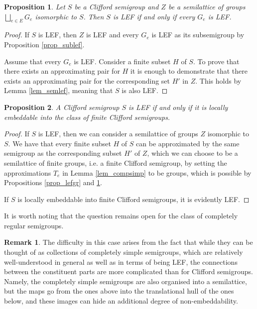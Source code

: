\documentclass{article}
\newtheorem{proposition}{Proposition}
\theoremstyle{definition}
\newtheorem{remark}{Remark}
\begin{document}
\begin{proposition}\label{prop_cliff1}
Let $S$ be a Clifford semigroup and $Z$ be a semilattice of groups $\bigsqcup\limits_{e\in E} G_e$ isomorphic to $S$. Then $S$ is LEF if and only if every $G_e$ is LEF.
\end{proposition}
\begin{proof}
If $S$ is LEF, then $Z$ is LEF and every $G_e$ is LEF as its subsemigroup by Proposition \ref{prop_sublef}.

Assume that every $G_e$ is LEF.  Consider a finite subset $H$ of $S$. To prove that there exists an approximating pair for $H$ it is enough to demonstrate that there exists an approximating pair for the corresponding set $H'$ in $Z$. This holds by Lemma \ref{lem_semlef}, meaning that $S$ is also LEF.
\end{proof}

\begin{proposition}
A Clifford semigroup $S$ is LEF if and only if it is locally embeddable into the class of finite Clifford semigroups. 
\end{proposition}
\begin{proof}
If $S$ is LEF, then we can consider a semilattice of groups $Z$ isomorphic to $S$. We have that every finite subset $H$ of $S$ can be approximated by the same semigroup as the corresponding subset $H'$ of $Z$, which we can choose to be a semilattice of finite groups, i.e. a finite Clifford semigroup, by setting the approximations $T_e$ in Lemma \ref{lem_compsimp} to be groups, which is possible by Propositions \ref{prop_lefgr} and \ref{prop_cliff1}.

If $S$ is locally embeddable into finite Clifford semigroups, it is evidently LEF.
\end{proof}

It is worth noting that the question remains open for the class of completely regular semigroups. 

\begin{remark}The difficulty in this case arises from the fact that while they can be thought of as collections of completely simple semigroups, which are relatively well-understood in general as well as in terms of being LEF, the connections between the constituent parts are more complicated than for Clifford semigroups. Namely, the completely simple semigroups are also organised into a semilattice, but the maps go from the ones above into the translational hull of the ones below, and these images can hide an additional degree of non-embeddability.
\end{remark}
\end{document}

